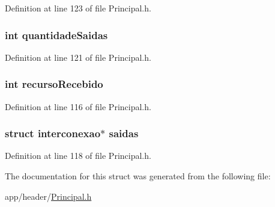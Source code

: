 Definition at line 123 of file Principal.\-h.

\hypertarget{structadaptador_a135fa6c241ccfd74d2e8413ebefc0579}{
\subsubsection[{quantidade\-Saidas}]{\setlength{\rightskip}{0pt plus 5cm}int quantidade\-Saidas}}\label{structadaptador_a135fa6c241ccfd74d2e8413ebefc0579}


Definition at line 121 of file Principal.\-h.

\hypertarget{structadaptador_a34541bd6c7eec1f2049716b02efe9572}{
\subsubsection[{recurso\-Recebido}]{\setlength{\rightskip}{0pt plus 5cm}int recurso\-Recebido}}\label{structadaptador_a34541bd6c7eec1f2049716b02efe9572}


Definition at line 116 of file Principal.\-h.

\hypertarget{structadaptador_a788fad8a0ec948140f9c2a340be29a09}{
\subsubsection[{saidas}]{\setlength{\rightskip}{0pt plus 5cm}struct {\bf interconexao}$\ast$ saidas}}\label{structadaptador_a788fad8a0ec948140f9c2a340be29a09}


Definition at line 118 of file Principal.\-h.



The documentation for this struct was generated from the following file\-:\begin{DoxyCompactItemize}
\item 
app/header/\hyperlink{_principal_8h}{Principal.\-h}\end{DoxyCompactItemize}
